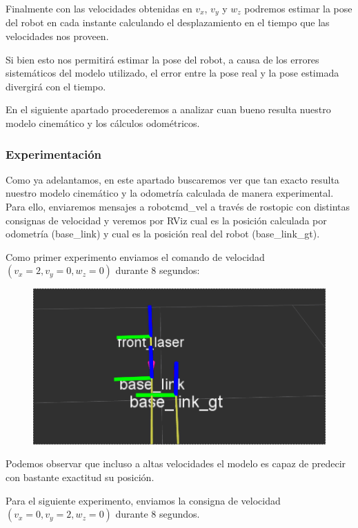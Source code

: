 Finalmente con las velocidades obtenidas en $v_x$, $v_y$ y $w_z$ podremos estimar la pose del robot en cada instante calculando el desplazamiento en el tiempo que las velocidades nos proveen.

Si bien esto nos permitirá estimar la pose del robot, a causa de los errores sistemáticos del modelo utilizado, el error entre la pose real y la pose estimada divergirá con el tiempo. 


En el siguiente apartado procederemos a analizar cuan bueno resulta nuestro modelo cinemático y los cálculos odométricos.

\subsubsection{Experimentación}

Como ya adelantamos, en este apartado buscaremos ver que tan exacto resulta nuestro modelo cinemático y la odometría calculada de manera experimental. Para ello, enviaremos mensajes a robot\/cmd\_vel a través de rostopic con distintas consignas de velocidad y veremos por RViz cual es la posición calculada por odometría (base\_link) y cual es la posición real del robot (base\_link\_gt). 


Como primer experimento enviamos el comando de velocidad $(v_x = 2, v_y=0, w_z=0)$ durante $8$ segundos:

\begin{figure}[!htb]
\includegraphics[width=\linewidth]{pruebasOdom/8segAdelante2.png}
\end{figure}


Podemos observar que incluso a altas velocidades el modelo es capaz de predecir con bastante exactitud su posición.

Para el siguiente experimento, enviamos la consigna de velocidad $(v_x = 0, v_y=2, w_z=0)$ durante $8$ segundos.


